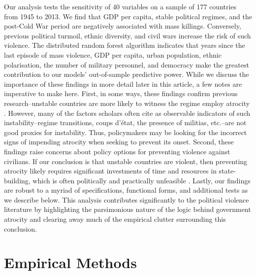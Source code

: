Our analysis tests the sensitivity of 40 variables on a sample of 177 countries from 1945 to 2013. We find that GDP per capita, stable political regimes, and the post-Cold War period are negatively associated with mass killings. Conversely, previous political turmoil, ethnic diversity, and civil wars increase the risk of such violence. The distributed random forest algorithm indicates that years since the last episode of mass violence, GDP per capita, urban population, ethnic polarisation, the number of military personnel, and democracy make the greatest contribution to our models' out-of-sample predictive power. While we discuss the importance of these findings in more detail later in this article, a few notes are imperative to make here. First, in some ways, these findings confirm previous research–unstable countries are more likely to witness the regime employ atrocity \citep[e.g.,]{goldsmith2013forecasting,harff2003no,krain1997state}.  However, many of the factors scholars often cite as observable indicators of such instability--regime transitions, coups d'état, the presence of militias, etc.--are not good proxies for instability. Thus, policymakers may be looking for the incorrect signs of impending atrocity when seeking to prevent its onset. Second, these findings raise concerns about policy options for preventing violence against civilians. If our conclusion is that unstable countries are violent, then preventing atrocity likely requires significant investments of time and resources in state-building, which is often politically and practically unfeasible \citep{doyle2006making}. Lastly, our findings are robust to a myriad of specifications, functional forms, and additional tests as we describe below. This analysis contributes significantly to the political violence literature by highlighting the parsimonious nature of the logic behind government atrocity and clearing away much of the empirical clutter surrounding this conclusion. 

\section{Empirical Methods}
\label{sec:methods4}

